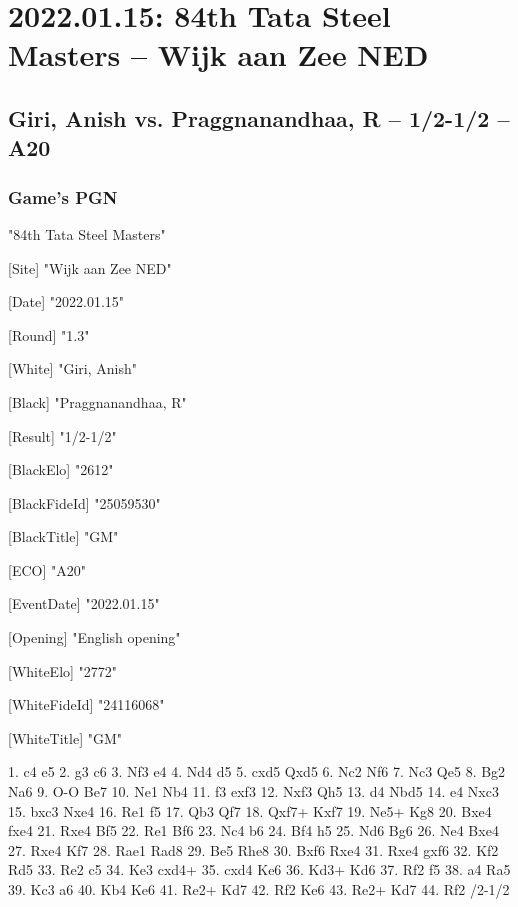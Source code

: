\documentclass[9pt]{extarticle}
\begin{document}
\section*{2022.01.15: 84th Tata Steel Masters -- Wijk aan Zee NED}

\subsection*{Giri, Anish vs. Praggnanandhaa, R -- 1/2-1/2 -- A20}
\subsubsection*{Game's PGN}
\begin{flushleft}
[Event] "84th Tata Steel Masters"

[Site] "Wijk aan Zee NED"

[Date] "2022.01.15"

[Round] "1.3"

[White] "Giri, Anish"

[Black] "Praggnanandhaa, R"

[Result] "1/2-1/2"

[BlackElo] "2612"

[BlackFideId] "25059530"

[BlackTitle] "GM"

[ECO] "A20"

[EventDate] "2022.01.15"

[Opening] "English opening"

[WhiteElo] "2772"

[WhiteFideId] "24116068"

[WhiteTitle] "GM"

\end{flushleft}
\begin{flushleft}
1. c4 e5 2. g3 c6 3. Nf3 e4 4. Nd4 d5 5. cxd5 Qxd5 6. Nc2 Nf6 7. Nc3 Qe5 8. Bg2 Na6 9. O-O Be7 10. Ne1 Nb4 11. f3 exf3 12. Nxf3 Qh5 13. d4 Nbd5 14. e4 Nxc3 15. bxc3 Nxe4 16. Re1 f5 17. Qb3 Qf7 18. Qxf7+ Kxf7 19. Ne5+ Kg8 20. Bxe4 fxe4 21. Rxe4 Bf5 22. Re1 Bf6 23. Nc4 b6 24. Bf4 h5 25. Nd6 Bg6 26. Ne4 Bxe4 27. Rxe4 Kf7 28. Rae1 Rad8 29. Be5 Rhe8 30. Bxf6 Rxe4 31. Rxe4 gxf6 32. Kf2 Rd5 33. Re2 c5 34. Ke3 cxd4+ 35. cxd4 Ke6 36. Kd3+ Kd6 37. Rf2 f5 38. a4 Ra5 39. Kc3 a6 40. Kb4 Ke6 41. Re2+ Kd7 42. Rf2 Ke6 43. Re2+ Kd7 44. Rf2 \quad  {}/2-1/2
\end{flushleft}
\parindent 0mm
\end{document}
